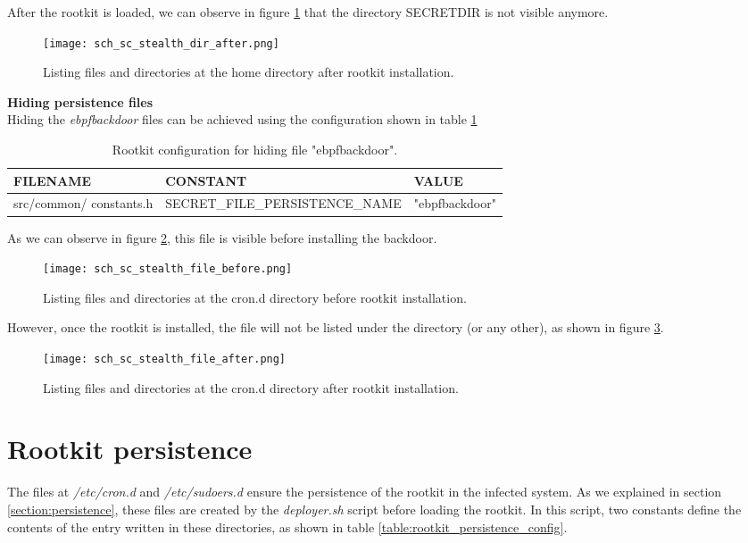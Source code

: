 After the rootkit is loaded, we can observe in figure \ref{fig:sc_stealth_dir_after} that the directory SECRETDIR is not visible anymore.

\begin{figure}[htbp]
	\centering
	\texttt{[image: sch\_sc\_stealth\_dir\_after.png]}
	\caption{Listing files and directories at the home directory after rootkit installation.}
	\label{fig:sc_stealth_dir_after}
\end{figure}

\textbf{Hiding persistence files}\\
Hiding the \textit{ebpfbackdoor} files can be achieved using the configuration shown in table \ref{}

\begin{table}[htbp]
\begin{tabular}{|>{\centering\arraybackslash}p{3cm}|>{\centering\arraybackslash}p{4.5cm}|>{\centering\arraybackslash}p{6cm}|}
\hline
\textbf{FILENAME} & \textbf{CONSTANT} & \textbf{VALUE}\\
\hline
\hline
src/common/ constants.h & SECRET\_FILE\_PERSISTENCE\_NAME & "ebpfbackdoor"\\
\hline
\end{tabular}
\caption{Rootkit configuration for hiding file "ebpfbackdoor".}
\label{table:rootkit_stealth_config_file}
\end{table}

As we can observe in figure \ref{fig:sc_stealth_file_before}, this file is visible before installing the backdoor.

\begin{figure}[htbp]
	\centering
	\texttt{[image: sch\_sc\_stealth\_file\_before.png]}
	\caption{Listing files and directories at the cron.d directory before rootkit installation.}
	\label{fig:sc_stealth_file_before}
\end{figure}

However, once the rootkit is installed, the file will not be listed under the directory (or any other), as shown in figure \ref{fig:sc_stealth_file_after}.

\begin{figure}[htbp]
	\centering
	\texttt{[image: sch\_sc\_stealth\_file\_after.png]}
	\caption{Listing files and directories at the cron.d directory after rootkit installation.}
	\label{fig:sc_stealth_file_after}
\end{figure}


\section{Rootkit persistence}
The files at \textit{/etc/cron.d} and \textit{/etc/sudoers.d} ensure the persistence of the rootkit in the infected system. As we explained in section \ref{section:persistence}, these files are created by the \textit{deployer.sh} script before loading the rootkit. In this script, two constants define the contents of the entry written in these directories, as shown in table \ref{table:rootkit_persistence_config}.

